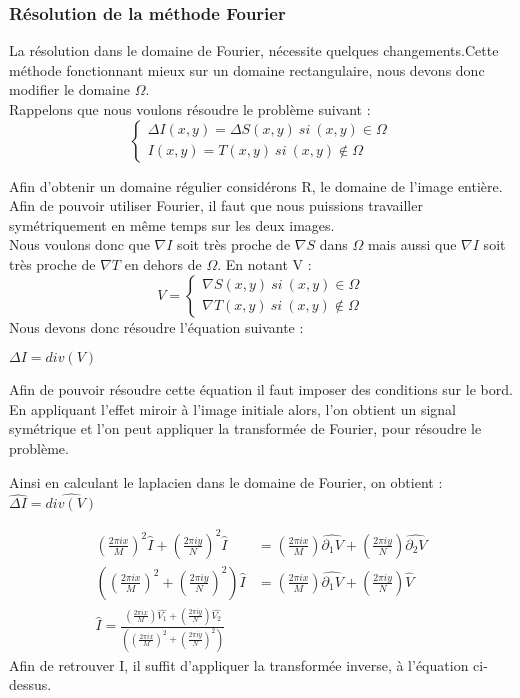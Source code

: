 \subsubsection{Résolution de la méthode Fourier}
La résolution dans le domaine de Fourier, nécessite quelques changements.Cette méthode fonctionnant mieux sur un domaine rectangulaire, nous devons donc modifier le domaine $\Omega$.\\
Rappelons que nous voulons résoudre le problème suivant :
\begin{equation}
\left\{
\begin{aligned}
\Delta I(x,y) = \Delta S(x,y) \ si \ (x,y) \in \Omega\\
I(x,y) = T(x,y) \ si \ (x,y) \notin \Omega
\end{aligned}
\right.
\end{equation}

Afin d'obtenir un domaine régulier considérons R, le domaine de l'image entière. Afin de pouvoir utiliser Fourier, il faut que nous puissions travailler symétriquement en même temps sur les deux images.\\
Nous voulons donc que $\nabla I$ soit très proche de $\nabla S$ dans $\Omega$ mais aussi que $\nabla I$ soit très proche de $\nabla T$ en dehors de $\Omega$. En notant V : 
\begin{equation}
V = 
\left\{
\begin{aligned}
\nabla S(x,y) \ si \ (x,y) \in \Omega\\
\nabla T(x,y) \ si \ (x,y) \notin \Omega
\end{aligned}
\right.
\end{equation}
Nous devons donc résoudre l'équation suivante : 
\begin{center}
$ \Delta I = div(V)$
\end{center}
Afin de pouvoir résoudre cette équation il faut imposer des conditions sur le bord. En appliquant l'effet miroir à l'image initiale alors, l'on obtient un signal symétrique  et l'on peut appliquer la transformée de Fourier, pour résoudre le problème. 

Ainsi en calculant le laplacien dans le domaine de Fourier, on obtient  : $\widehat{\Delta I} = \widehat{div(V)}$

\begin{equation}
\begin{aligned}
\left(\frac{2\pi i x}{M}\right)^2 \widehat{I}+\left(\frac{2\pi i y}{N}\right)^2 \widehat{I} & = \left(\frac{2\pi i x}{M}\right) \widehat{\partial _1 V}+\left(\frac{2\pi i y}{N}\right) \widehat{\partial _2 V}\\
\left(\left(\frac{2\pi i x}{M}\right)^2+\left(\frac{2\pi i y}{N}\right)^2\right) \widehat{I} & = \left(\frac{2\pi i x}{M}\right) \widehat{\partial _1 V}+\left(\frac{2\pi i y}{N}\right) \widehat{V}\\
\widehat{I} = \frac{\left(\frac{2\pi i x}{M}\right) \widehat{V_1}+\left(\frac{2\pi i y}{N}\right) \widehat{V_2}}{\left(\left(\frac{2\pi i x}{M}\right)^2+\left(\frac{2\pi i y}{N}\right)^2\right)}
\end{aligned}
\end{equation}
Afin de retrouver I, il suffit d'appliquer la transformée inverse, à l'équation ci-dessus.
